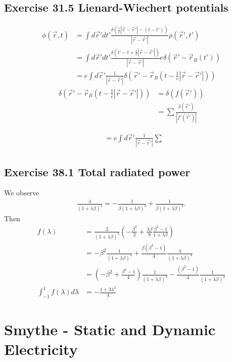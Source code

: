 \documentclass[10pt,a4paper]{book}
\theoremstyle{definition}
\begin{document}
\subsection{Exercise 31.5 Lienard-Wiechert potentials}
\begin{align}
\phi(\vec{r},t)&=\int d\vec{r}'dt'\frac{\delta(\frac{1}{c}|\vec{r}-\vec{r}'|-(t-t'))}{|\vec{r}-\vec{r}'|}\rho(\vec{r}',t')\\
&=\int d\vec{r}'dt'\frac{\delta(t'-t+\frac{1}{c}|\vec{r}-\vec{r}'|)}{|\vec{r}-\vec{r}'|}e\delta(\vec{r}'-\vec{r}_B(t'))\\
&=e\int d\vec{r}'\frac{1}{|\vec{r}-\vec{r}'|}\delta(\vec{r}'-\vec{r}_B(t-\frac{1}{c}|\vec{r}-\vec{r}'|))
\end{align}
\begin{align}
\delta(\vec{r}'-\vec{r}_B(t-\frac{1}{c}|\vec{r}-\vec{r}'|))&=\delta(f(\vec{r}'))\\
&=\sum\frac{\delta(\vec{r}')}{|f'(\vec{r}')|}
\end{align}

\begin{align}
&=e\int d\vec{r}'\frac{1}{|\vec{r}-\vec{r}'|}\sum\frac{}{}
\end{align}


\subsection{Exercise 38.1 Total radiated power}
We observe
\begin{align}
\frac{\lambda}{(1+\lambda\beta)^4}=-\frac{1}{\beta(1+\lambda\beta)^4}+\frac{1}{\beta(1+\lambda\beta)^3}.    
\end{align}
Then
\begin{align}
    f(\lambda)&=\frac{2}{(1+\lambda\beta)^3}\left(-\frac{\beta^2}{2}+\frac{\lambda\beta}{8}\frac{\beta^2-1}{1+\lambda\beta}\right)\\
    &=-\beta^2\frac{1}{(1+\lambda\beta)^3}+\frac{\beta(\beta^2-1)}{4}\frac{\lambda}{(1+\lambda\beta)^4}\\
    &=\left(-\beta^2+\frac{\beta^2-1}{4}\right)\frac{1}{(1+\lambda\beta)^3}-\frac{(\beta^2-1)}{4}\frac{1}{(1+\lambda\beta)^4}\\
    \int_{-1}^1f(\lambda)d\lambda&=-\frac{1+3\lambda^2}{4}
\end{align}


\section{{\sc Smythe} - Static and Dynamic Electricity}
\end{document}
